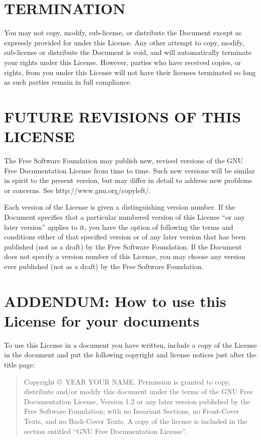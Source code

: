\documentclass[10pt,a4paper,titlepage,twoside,openright]{report}
\begin{document}
\section*{TERMINATION}
\label{termination}

You may not copy, modify, sub-license, or distribute the Document except
as expressly provided for under this License.  Any other attempt to
copy, modify, sub-license or distribute the Document is void, and will
automatically terminate your rights under this License.  However,
parties who have received copies, or rights, from you under this
License will not have their licenses terminated so long as such
parties remain in full compliance.


\section*{FUTURE REVISIONS OF THIS LICENSE}
\label{future}

The Free Software Foundation may publish new, revised versions
of the GNU Free Documentation License from time to time.  Such new
versions will be similar in spirit to the present version, but may
differ in detail to address new problems or concerns.  See
http://www.gnu.org/copyleft/.

Each version of the License is given a distinguishing version number.
If the Document specifies that a particular numbered version of this
License ``or any later version'' applies to it, you have the option of
following the terms and conditions either of that specified version or
of any later version that has been published (not as a draft) by the
Free Software Foundation.  If the Document does not specify a version
number of this License, you may choose any version ever published (not
as a draft) by the Free Software Foundation.


\section*{ADDENDUM: How to use this License for your documents}

To use this License in a document you have written, include a copy of
the License in the document and put the following copyright and
license notices just after the title page:

\begin{quote}
    Copyright \copyright\ YEAR  YOUR NAME.
    Permission is granted to copy, distribute and/or modify this document
    under the terms of the GNU Free Documentation License, Version 1.2
    or any later version published by the Free Software Foundation;
    with no Invariant Sections, no Front-Cover Texts, and no Back-Cover Texts.
    A copy of the license is included in the section entitled ``GNU
    Free Documentation License''.
\end{quote}
\end{document}
